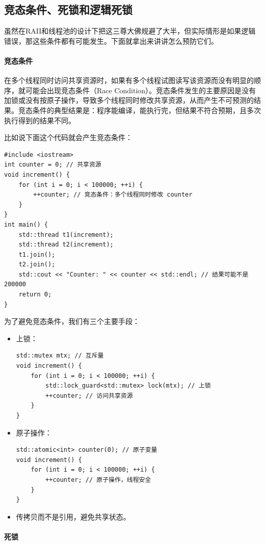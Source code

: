 \subsection{竞态条件、死锁和逻辑死锁}

虽然在RAII和线程池的设计下把这三尊大佛规避了大半，但实际情形是如果逻辑错误，那这些条件都有可能发生。下面就拿出来讲讲怎么预防它们。

\paragraph{竞态条件}

在多个线程同时访问共享资源时，如果有多个线程试图读写该资源而没有明显的顺序，就可能会出现竞态条件（Race Condition）。竞态条件发生的主要原因是没有加锁或没有按原子操作，导致多个线程同时修改共享资源，从而产生不可预测的结果。竞态条件的典型结果是：程序能编译，能执行完，但结果不符合预期，且多次执行得到的结果不同。

比如说下面这个代码就会产生竞态条件：
\begin{verbatim}
#include <iostream>
int counter = 0; // 共享资源
void increment() {
    for (int i = 0; i < 100000; ++i) {
        ++counter; // 竞态条件：多个线程同时修改 counter
    }
}
int main() {
    std::thread t1(increment);
    std::thread t2(increment);
    t1.join();
    t2.join();
    std::cout << "Counter: " << counter << std::endl; // 结果可能不是 200000
    return 0;
}
\end{verbatim}
为了避免竞态条件，我们有三个主要手段：
\begin{itemize}
    \item 上锁：
    \begin{verbatim}
std::mutex mtx; // 互斥量
void increment() {
    for (int i = 0; i < 100000; ++i) {
        std::lock_guard<std::mutex> lock(mtx); // 上锁
        ++counter; // 访问共享资源
    }
}
    \end{verbatim}
    \item 原子操作：
    \begin{verbatim}
std::atomic<int> counter(0); // 原子变量
void increment() {
    for (int i = 0; i < 100000; ++i) {
        ++counter; // 原子操作，线程安全
    }
}
    \end{verbatim}
    \item 传拷贝而不是引用，避免共享状态。
\end{itemize}

\paragraph{死锁}

